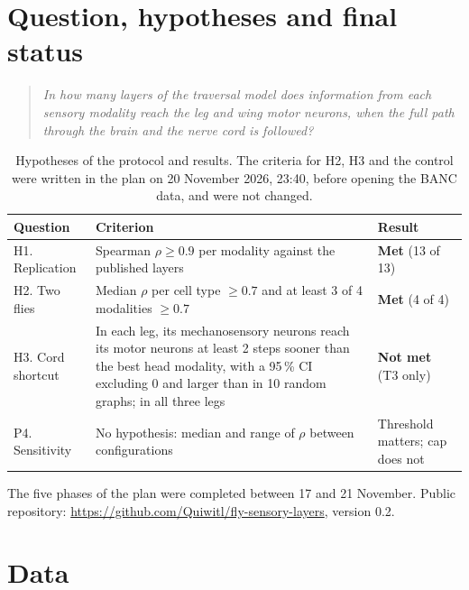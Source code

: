 \documentclass[11pt,letterpaper]{article}
\begin{document}
\section{Question, hypotheses and final status}

\begin{quote}
\emph{In how many layers of the traversal model does information from each sensory modality reach the leg and wing motor neurons, when the full path through the brain and the nerve cord is followed?}
\end{quote}

\begin{table}[H]
\centering
\small
\begin{tabularx}{\linewidth}{@{}p{2.9cm}Lp{3.2cm}@{}}
\toprule
\textbf{Question} & \textbf{Criterion} & \textbf{Result} \\
\midrule
H1. Replication & Spearman $\rho \ge 0.9$ per modality against the published layers & \textbf{Met} (13 of 13) \\
H2. Two flies & Median $\rho$ per cell type $\ge 0.7$ and at least 3 of 4 modalities $\ge 0.7$ & \textbf{Met} (4 of 4) \\
H3. Cord shortcut & In each leg, its mechanosensory neurons reach its motor neurons at least 2 steps sooner than the best head modality, with a 95\,\% CI excluding 0 and larger than in 10 random graphs; in all three legs & \textbf{Not met} (T3 only) \\
P4. Sensitivity & No hypothesis: median and range of $\rho$ between configurations & Threshold matters; cap does not \\
\bottomrule
\end{tabularx}
\caption{Hypotheses of the protocol and results. The criteria for H2, H3 and the control were written in the plan on 20 November 2026, 23:40, before opening the BANC data, and were not changed.}
\end{table}

\noindent The five phases of the plan were completed between 17 and 21 November. Public repository: \url{https://github.com/Quiwitl/fly-sensory-layers}, version 0.2.

\section{Data}
\end{document}
